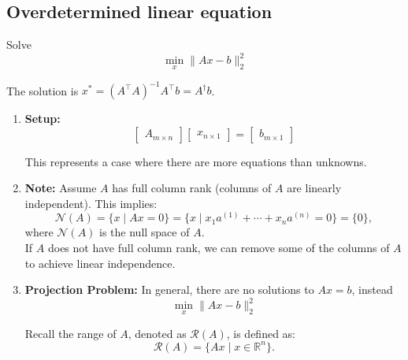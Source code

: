 \subsection{Overdetermined linear equation}
\begin{definition}
    Solve 
    \begin{equation*}
        \min_x \|Ax - b\|_2^2
    \end{equation*}

    The solution is  $x^* = (A^\top A)^{-1} A^\top b = A^\dagger b$.
\end{definition}
\begin{derivation}
    \begin{enumerate}
        \item \textbf{Setup:} \[
    \begin{bmatrix}
    A_{m \times n}
    \end{bmatrix}
    \begin{bmatrix}
    x_{n \times 1}
    \end{bmatrix}
    =
    \begin{bmatrix}
    b_{m \times 1}
    \end{bmatrix}
    \]


    This represents a case where there are more equations than unknowns. \\

    \item \textbf{Note:} Assume $A$ has full column rank (columns of $A$ are linearly independent). This implies:
    \[
    \mathcal{N}(A) = \{x \mid A x = 0 \} = \{x \mid x_1 a^{(1)} + \cdots + x_n a^{(n)} = 0 \} = \{0\},
    \]
    where $\mathcal{N}(A)$ is the null space of $A$. \\

    If $A$ does not have full column rank, we can remove some of the columns of $A$ to achieve linear independence. \\

    \item \textbf{Projection Problem:} In general, there are no solutions to $Ax=b$, instead
    \begin{equation*}
        \min_x \|Ax - b\|_2^2 
    \end{equation*}

    Recall the range of $A$, denoted as $\mathcal{R}(A)$, is defined as:
    \[
    \mathcal{R}(A) = \{Ax \mid x \in \mathbb{R}^n\}.
    \]


\end{enumerate}
\end{derivation}
